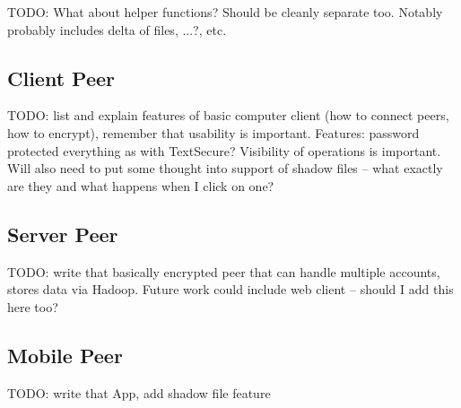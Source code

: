 TODO: What about helper functions?
Should be cleanly separate too.
Notably probably includes delta of files, ...?, etc.

\subsection{Client Peer}

TODO: list and explain features of basic computer client (how to connect peers, how to encrypt), remember that usability is important.
Features: password protected everything as with TextSecure?
Visibility of operations is important.
Will also need to put some thought into support of shadow files – what exactly are they and what happens when I click on one?

\subsection{Server Peer}

TODO: write that basically encrypted peer that can handle multiple accounts, stores data via Hadoop.
Future work could include web client – should I add this here too?

\subsection{Mobile Peer}

TODO: write that App, add shadow file feature
